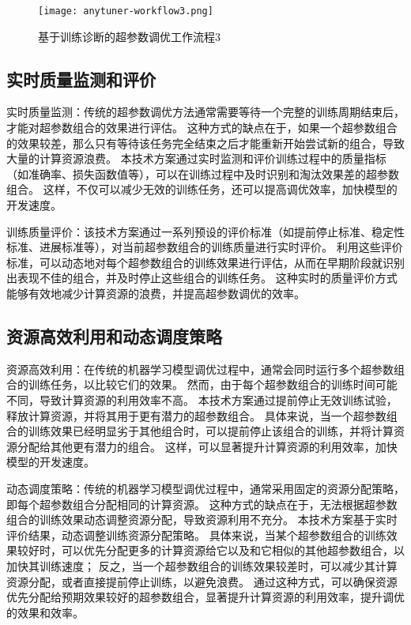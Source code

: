 \begin{figure}
  \centering
  \texttt{[image: anytuner-workflow3.png]}
  \caption{基于训练诊断的超参数调优工作流程3}
  \label{fig:anytunerworkflow3}
\end{figure}

\subsection{实时质量监测和评价}

实时质量监测：传统的超参数调优方法通常需要等待一个完整的训练周期结束后，才能对超参数组合的效果进行评估。
这种方式的缺点在于，如果一个超参数组合的效果较差，那么只有等待该任务完全结束之后才能重新开始尝试新的组合，导致大量的计算资源浪费。
本技术方案通过实时监测和评价训练过程中的质量指标（如准确率、损失函数值等），可以在训练过程中及时识别和淘汰效果差的超参数组合。
这样，不仅可以减少无效的训练任务，还可以提高调优效率，加快模型的开发速度。

训练质量评价：该技术方案通过一系列预设的评价标准（如提前停止标准、稳定性标准、进展标准等），对当前超参数组合的训练质量进行实时评价。
利用这些评价标准，可以动态地对每个超参数组合的训练效果进行评估，从而在早期阶段就识别出表现不佳的组合，并及时停止这些组合的训练任务。
这种实时的质量评价方式能够有效地减少计算资源的浪费，并提高超参数调优的效率。

\subsection{资源高效利用和动态调度策略}

资源高效利用：在传统的机器学习模型调优过程中，通常会同时运行多个超参数组合的训练任务，以比较它们的效果。
然而，由于每个超参数组合的训练时间可能不同，导致计算资源的利用效率不高。
本技术方案通过提前停止无效训练试验，释放计算资源，并将其用于更有潜力的超参数组合。
具体来说，当一个超参数组合的训练效果已经明显劣于其他组合时，可以提前停止该组合的训练，并将计算资源分配给其他更有潜力的组合。
这样，可以显著提升计算资源的利用效率，加快模型的开发速度。

动态调度策略：传统的机器学习模型调优过程中，通常采用固定的资源分配策略，即每个超参数组合分配相同的计算资源。
这种方式的缺点在于，无法根据超参数组合的训练效果动态调整资源分配，导致资源利用不充分。
本技术方案基于实时评价结果，动态调整训练资源分配策略。
具体来说，当某个超参数组合的训练效果较好时，可以优先分配更多的计算资源给它以及和它相似的其他超参数组合，以加快其训练速度；
反之，当一个超参数组合的训练效果较差时，可以减少其计算资源分配，或者直接提前停止训练，以避免浪费。
通过这种方式，可以确保资源优先分配给预期效果较好的超参数组合，显著提升计算资源的利用效率，提升调优的效果和效率。


